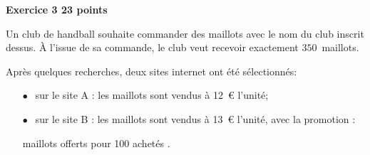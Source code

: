 \textbf{\large Exercice 3 \hfill 23 points}

\medskip

Un club de handball souhaite commander des maillots avec le nom du club inscrit dessus. À l'issue de sa commande, le club veut recevoir exactement $350$~maillots.

Après quelques recherches, deux sites internet ont été sélectionnés:

\setlength\parindent{1cm}
\begin{itemize}
\item[$\bullet~~$] sur le site A : les maillots sont vendus à 12~\euro{} l'unité;
\item[$\bullet~~$] sur le site B : les maillots sont vendus à 13~\euro{} l'unité, avec la promotion :

\begin{center} maillots offerts pour 100 achetés \fg.\end{center}
\end{itemize}
\setlength\parindent{0cm}

\medskip

